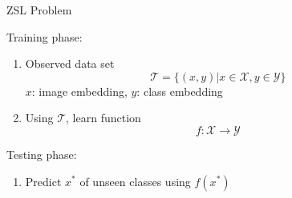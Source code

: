 \documentclass[mathserif, xcolor=table]{beamer}
\def\T{\mathcal{T}}
\def\X{\mathcal{X}}
\def\Y{\mathcal{Y}}
\def\X{\mathcal{X}}
\def\Y{\mathcal{Y}}
\begin{document}
\begin{frame}{ZSL Problem}

Training phase: 
\begin{enumerate}
\item{Observed data set} 
\begin{equation*}
\T = \{(x, y)| x \in \X, y \in \Y \}
\end{equation*}
$x$: image embedding, $y$: class embedding

\item{Using $\T$, learn function}
\begin{equation*}
f: \X \rightarrow \Y
\end{equation*}

\end{enumerate}

Testing phase: 
\begin{enumerate}
\item{Predict $x^*$ of unseen classes using $f(x^*)$} 

\end{enumerate}

\end{frame}
\end{document}
